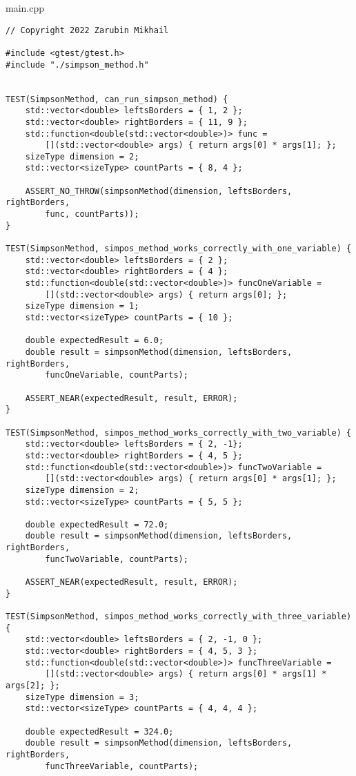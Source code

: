 \documentclass{report}
\begin{document}
main.cpp
\begin{lstlisting}
// Copyright 2022 Zarubin Mikhail

#include <gtest/gtest.h>
#include "./simpson_method.h"


TEST(SimpsonMethod, can_run_simpson_method) {
    std::vector<double> leftsBorders = { 1, 2 };
    std::vector<double> rightBorders = { 11, 9 };
    std::function<double(std::vector<double>)> func =
        [](std::vector<double> args) { return args[0] * args[1]; };
    sizeType dimension = 2;
    std::vector<sizeType> countParts = { 8, 4 };

    ASSERT_NO_THROW(simpsonMethod(dimension, leftsBorders, rightBorders,
        func, countParts));
}

TEST(SimpsonMethod, simpos_method_works_correctly_with_one_variable) {
    std::vector<double> leftsBorders = { 2 };
    std::vector<double> rightBorders = { 4 };
    std::function<double(std::vector<double>)> funcOneVariable =
        [](std::vector<double> args) { return args[0]; };
    sizeType dimension = 1;
    std::vector<sizeType> countParts = { 10 };

    double expectedResult = 6.0;
    double result = simpsonMethod(dimension, leftsBorders, rightBorders,
        funcOneVariable, countParts);

    ASSERT_NEAR(expectedResult, result, ERROR);
}

TEST(SimpsonMethod, simpos_method_works_correctly_with_two_variable) {
    std::vector<double> leftsBorders = { 2, -1};
    std::vector<double> rightBorders = { 4, 5 };
    std::function<double(std::vector<double>)> funcTwoVariable =
        [](std::vector<double> args) { return args[0] * args[1]; };
    sizeType dimension = 2;
    std::vector<sizeType> countParts = { 5, 5 };

    double expectedResult = 72.0;
    double result = simpsonMethod(dimension, leftsBorders, rightBorders,
        funcTwoVariable, countParts);

    ASSERT_NEAR(expectedResult, result, ERROR);
}

TEST(SimpsonMethod, simpos_method_works_correctly_with_three_variable) {
    std::vector<double> leftsBorders = { 2, -1, 0 };
    std::vector<double> rightBorders = { 4, 5, 3 };
    std::function<double(std::vector<double>)> funcThreeVariable =
        [](std::vector<double> args) { return args[0] * args[1] * args[2]; };
    sizeType dimension = 3;
    std::vector<sizeType> countParts = { 4, 4, 4 };

    double expectedResult = 324.0;
    double result = simpsonMethod(dimension, leftsBorders, rightBorders,
        funcThreeVariable, countParts);


\end{lstlisting}
\end{document}
